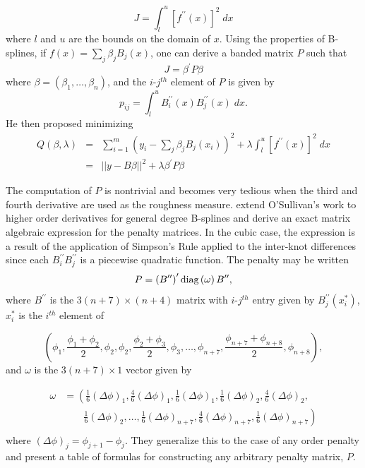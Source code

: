 \documentclass[12pt]{article}
\theoremstyle{definition}
\begin{document}
 \[
 J = \int_l^u \left[ f^{\prime \prime}\left(x\right)\right]^2\;dx
 \]
 \noindent
 where $l$ and $u$ are the bounds on the domain of $x$. Using the properties of B-splines, if $f\left(x\right) = \sum_{j} \beta_j B_j\left(x\right)$, one can derive a banded matrix $P$ such that 
 \[
 J = \beta^\prime P \beta
 \] 
 \noindent
 where $\beta = \left(\beta_1,\dots, \beta_n\right)$, and the $i$-$j^{th}$ element of $P$ is given by
 \[
 p_{ij} = \int_l^u B_i^{\prime \prime} \left( x \right)B_j^{\prime \prime} \left( x \right)\;dx.
 \]
 \noindent
 He then proposed minimizing
 \begin{eqnarray*}
 Q\left(\beta, \lambda \right) &=& \sum_{i=1}^m \left(y_i - \sum_{j} \beta_j B_j\left(x_i \right)\right)^2 + \lambda \int_l^u \left[ f^{\prime \prime}\left(x\right)\right]^2\;dx\\
 &=& \vert \vert y - B\beta \vert  \vert^2 + \lambda\beta^\prime P \beta
 \end{eqnarray*}

The computation of $P$ is nontrivial and becomes very tedious when the third and fourth derivative are used as the roughness measure. \cite{wand2008semiparametric} extend O'Sullivan's work to higher order derivatives for general degree B-splines and derive an exact matrix algebraic expression for the penalty matrices. In the cubic case, the expression is a result of the application of Simpson's Rule applied to the inter-knot differences since each $B_i^{\prime \prime} B_j^{\prime \prime}$ is a piecewise quadratic function. The penalty may be written
 \[
 P = \left(B^{\prime \prime}\right)^\prime \textup{diag}\left(\omega \right) B^{\prime \prime}, 
 \]
 \noindent
 where $B^{\prime \prime}$ is the $3\left( n + 7 \right) \times \left( n + 4 \right)$ matrix with $i$-$j^{th}$ entry given by $B_j^{\prime \prime} \left(x_i^*\right)$, $x^*_i$ is the $i^{th}$ element of 
 
\[
\left( \phi_1,\frac{\phi_1+\phi_2}{2},\phi_2,\phi_2,\frac{\phi_2+\phi_3}{2},\phi_3,\dots,\phi_{n+7},\frac{\phi_{n+7}+\phi_{n+8}}{2},\phi_{n+8} \right),
\]
 \noindent
 and $\omega$ is the $3\left(n+7\right) \times 1$ vector given by
 
\begin{align*}
\omega &= \left( \frac{1}{6}\left(\Delta \phi \right)_1,\frac{4}{6}\left(\Delta \phi \right)_1, \frac{1}{6}\left(\Delta \phi \right)_1,\frac{1}{6}\left(\Delta \phi \right)_2, \frac{4}{6}\left(\Delta \phi \right)_2,  \right. \\
&\qquad   \left. {} \frac{1}{6}\left(\Delta \phi \right)_2 , \dots , \frac{1}{6}\left(\Delta \phi \right)_{n+7}, \frac{4}{6}\left(\Delta \phi \right)_{n+7}, \frac{1}{6}\left(\Delta \phi \right)_{n+7}  \right) \\
\end{align*}
\noindent
 where $\left(\Delta \phi \right)_j = \phi_{j+1}-\phi_j$. They generalize this to the case of any order penalty and present a table of formulas for constructing any arbitrary penalty matrix, $P$.
 
\end{document}
